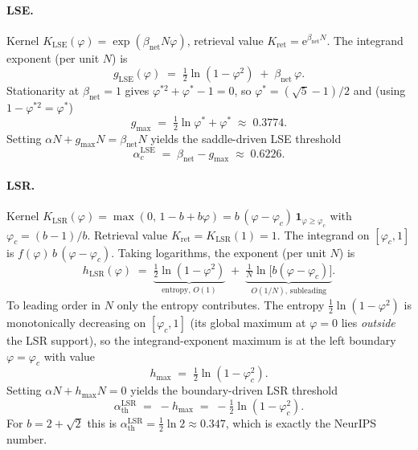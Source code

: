 \documentclass[11pt]{article}
\newcommand{\Bnet}{\beta_{\mathrm{net}}}
\newcommand{\athLSR}{\alpha_{\mathrm{th}}^{\mathrm{LSR}}}
\newcommand{\acLSE}{\alpha_c^{\mathrm{LSE}}}
\begin{document}
\paragraph{LSE.}
Kernel $K_{\mathrm{LSE}}(\varphi) = \exp(\Bnet N \varphi)$,
retrieval value $K_{\mathrm{ret}} = \mathrm{e}^{\Bnet N}$. The integrand
exponent (per unit $N$) is
\begin{equation}
g_{\mathrm{LSE}}(\varphi) \;=\; \tfrac12 \ln(1-\varphi^2) \;+\; \Bnet\,\varphi.
\label{eq:gLSE}
\end{equation}
Stationarity at $\Bnet = 1$ gives $\varphi^{*2} + \varphi^{*} - 1 = 0$,
so $\varphi^{*} = (\sqrt{5}-1)/2$ and (using $1 - \varphi^{*2} = \varphi^{*}$)
\begin{equation}
g_{\max} \;=\; \tfrac12 \ln \varphi^{*} + \varphi^{*} \;\approx\; 0.3774.
\end{equation}
Setting $\alpha N + g_{\max} N = \Bnet N$ yields the saddle-driven LSE
threshold
\begin{equation}
\boxed{\;\acLSE \;=\; \Bnet - g_{\max} \;\approx\; 0.6226.\;}
\label{eq:acLSE}
\end{equation}

\paragraph{LSR.}
Kernel $K_{\mathrm{LSR}}(\varphi) = \max(0,\,1 - b + b\varphi) = b\,(\varphi-\varphi_c)\,\mathbf{1}_{\varphi \geq \varphi_c}$
with $\varphi_c = (b-1)/b$. Retrieval value $K_{\mathrm{ret}} = K_{\mathrm{LSR}}(1) = 1$.
The integrand on $[\varphi_c, 1]$ is $f(\varphi)\,b\,(\varphi-\varphi_c)$.
Taking logarithms, the exponent (per unit $N$) is
\begin{equation}
h_{\mathrm{LSR}}(\varphi)
\;=\; \underbrace{\tfrac12 \ln(1-\varphi^2)}_{\text{entropy, }O(1)}
   \;+\; \underbrace{\tfrac{1}{N}\ln\bigl[b(\varphi-\varphi_c)\bigr]}_{O(1/N),\,\text{subleading}}.
\label{eq:hLSR}
\end{equation}
To leading order in $N$ only the entropy contributes. The entropy
$\tfrac12 \ln(1-\varphi^2)$ is monotonically decreasing on $[\varphi_c, 1]$
(its global maximum at $\varphi = 0$ lies \emph{outside} the LSR support),
so the integrand-exponent maximum is at the left boundary $\varphi = \varphi_c$
with value
\begin{equation}
h_{\max} \;=\; \tfrac12 \ln(1-\varphi_c^2).
\end{equation}
Setting $\alpha N + h_{\max} N = 0$ yields the boundary-driven LSR threshold
\begin{equation}
\boxed{\;\athLSR \;=\; -h_{\max} \;=\; -\tfrac12 \ln(1-\varphi_c^2).\;}
\label{eq:athLSR}
\end{equation}
For $b = 2 + \sqrt{2}$ this is $\athLSR = \tfrac12 \ln 2 \approx 0.347$,
which is exactly the NeurIPS number.
\end{document}
